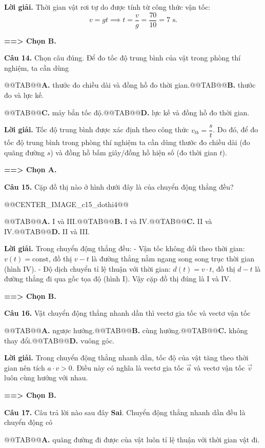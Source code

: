 \documentclass[11pt,a4paper]{article}
\begin{document}
\textbf{Lời giải.} Thời gian vật rơi tự do được tính từ công thức vận tốc:
\[
v = gt \implies t = \frac{v}{g} = \frac{70}{10} = 7\text{ s}.
\]

\textbf{==> Chọn B.}

\textbf{Câu 14.} Chọn câu đúng. Để đo tốc độ trung bình của vật trong phòng thí nghiệm, ta cần dùng

@@TAB@@\textbf{A.} thước đo chiều dài và đồng hồ đo thời gian.@@TAB@@\textbf{B.} thước đo và lực kế.

@@TAB@@\textbf{C.} máy bắn tốc độ.@@TAB@@\textbf{D.} lực kế và đồng hồ đo thời gian.

\textbf{Lời giải.} Tốc độ trung bình được xác định theo công thức $v_{tb} = \dfrac{s}{t}$. Do đó, để đo tốc độ trung bình trong phòng thí nghiệm ta cần dùng thước đo chiều dài (đo quãng đường $s$) và đồng hồ bấm giây/đồng hồ hiện số (đo thời gian $t$).

\textbf{==> Chọn A.}

\textbf{Câu 15.} Cặp đồ thị nào ở hình dưới đây là của chuyển động thẳng đều?

@@CENTER_IMAGE_c15_dothi4@@

@@TAB@@\textbf{A.} I và III.@@TAB@@\textbf{B.} I và IV.@@TAB@@\textbf{C.} II và IV.@@TAB@@\textbf{D.} II và III.

\textbf{Lời giải.} Trong chuyển động thẳng đều:
- Vận tốc không đổi theo thời gian: $v(t) = \text{const}$, đồ thị $v - t$ là đường thẳng nằm ngang song song trục thời gian (hình IV).
- Độ dịch chuyển tỉ lệ thuận với thời gian: $d(t) = v \cdot t$, đồ thị $d - t$ là đường thẳng đi qua gốc tọa độ (hình I).
Vậy cặp đồ thị đúng là I và IV.

\textbf{==> Chọn B.}

\textbf{Câu 16.} Vật chuyển động thẳng nhanh dần thì vectơ gia tốc và vectơ vận tốc

@@TAB@@\textbf{A.} ngược hướng.@@TAB@@\textbf{B.} cùng hướng.@@TAB@@\textbf{C.} không thay đổi.@@TAB@@\textbf{D.} vuông góc.

\textbf{Lời giải.} Trong chuyển động thẳng nhanh dần, tốc độ của vật tăng theo thời gian nên tích $a \cdot v > 0$. Điều này có nghĩa là vectơ gia tốc $\vec{a}$ và vectơ vận tốc $\vec{v}$ luôn cùng hướng với nhau.

\textbf{==> Chọn B.}

\textbf{Câu 17.} Câu trả lời nào sau đây \textbf{Sai}. Chuyển động thẳng nhanh dần đều là chuyển động có

@@TAB@@\textbf{A.} quãng đường đi được của vật luôn tỉ lệ thuận với thời gian vật đi.
\end{document}
